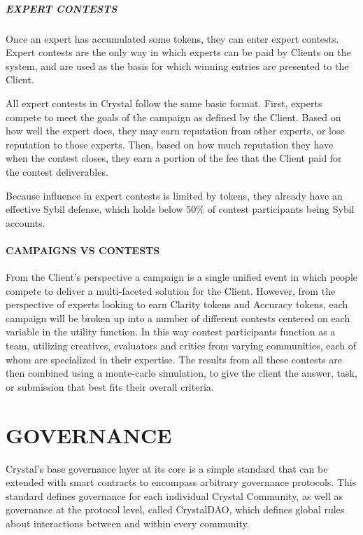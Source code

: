 \subparagraph{EXPERT CONTESTS}\label{expert-contests}

Once an expert has accumulated some tokens, they can enter expert
contests. Expert contests are the only way in which experts can be paid
by Clients on the system, and are used as the basis for which winning
entries are presented to the Client.

All expert contests in Crystal follow the same basic format. First,
experts compete to meet the goals of the campaign as defined by the
Client. Based on how well the expert does, they may earn reputation from
other experts, or lose reputation to those experts. Then, based on how
much reputation they have when the contest closes, they earn a portion
of the fee that the Client paid for the contest deliverables.

Because influence in expert contests is limited by tokens, they already
have an effective Sybil defense, which holds below 50\% of contest
participants being Sybil accounts.

\paragraph{CAMPAIGNS VS CONTESTS}\label{campaigns-vs-contests}

From the Client's perspective a campaign is a single unified event in
which people compete to deliver a multi-faceted solution for the Client.
However, from the perspective of experts looking to earn Clarity tokens
and Accuracy tokens, each campaign will be broken up into a number of
different contests centered on each variable in the utility function. In
this way contest participants function as a team, utilizing creatives,
evaluators and critics from varying communities, each of whom are
specialized in their expertise. The results from all these contests are
then combined using a monte-carlo simulation, to give the client the
answer, task, or submission that best fits their overall criteria.

\section{\texorpdfstring{\protect\hypertarget{_ikggzbtiqopr}{}{\protect\hypertarget{_Toc462050415}{}{}}GOVERNANCE}{GOVERNANCE}}\label{governance}

Crystal's base governance layer at its core is a simple standard that
can be extended with smart contracts to encompass arbitrary governance
protocols. This standard defines governance for each individual Crystal
Community, as well as governance at the protocol level, called
CrystalDAO, which defines global rules about interactions between and
within every community.

